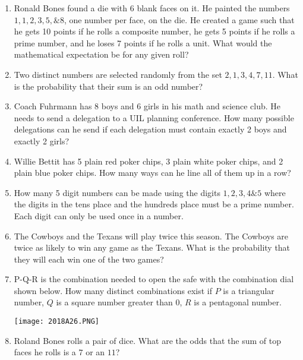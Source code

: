 \documentclass[../uilmath.tex]{subfiles}
\begin{document}
\begin{enumerate}[label=\bfseries\arabic*.]
    \item %
    Ronald Bones found a die with 6 blank faces on it. He painted the numbers $1,1,2,3,5,\& 8$, one number per face, on the die.
    He created a game such that he gets 10 points if he rolls a composite number, he gets 5 points if he rolls a prime number, and he loses 
    7 points if he rolls a unit. What would the mathematical expectation be for any given roll?

    \item %
    Two distinct numbers are selected randomly from the set ${2,1,3,4,7,11}$. What is the probability that their sum is an odd number?

    \item %
    Coach Fuhrmann has 8 boys and 6 girls in his math and science club. He needs to send a delegation to a UIL planning conference. 
    How many possible delegations can he send if each delegation must contain exactly 2 boys and exactly 2 girls?

    \item %
    Willie Bettit has 5 plain red poker chips, 3 plain white poker chips, and 2 plain blue poker chips. How many ways can he line all of them up in a row?

    \item %
    How many 5 digit numbers can be made using the digits $1,2,3,4 \& 5$ where the digits in the tens place and the hundreds place must be a prime number. Each digit can only be used once in a number.

    \item %
    The Cowboys and the Texans will play twice this season. The Cowboys are twice as likely to win any game as the Texans. What is the probability that they will each win one of the two games?

    \item %
    P-Q-R is the combination needed to open the safe with the combination dial shown below. How many distinct combinations exist if $P$ is a triangular number, $Q$ is a square number 
    greater than 0, $R$ is a pentagonal number.
    \begin{center}
        \texttt{[image: 2018A26.PNG]}
    \end{center}

    \item %
    Roland Bones rolls a pair of dice. What are the odds that the sum of top faces he rolls is a $7$ or an $11$?


\end{enumerate}
\end{document}

